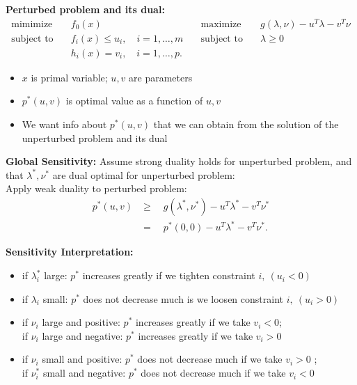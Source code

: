 \documentclass{report}
\theoremstyle{remark} \newtheorem{remark}{Remark}[section]
\theoremstyle{definition}
\theoremstyle{definition}
\theoremstyle{definition}
\theoremstyle{remark}
\begin{document}
\textbf{Perturbed problem and its dual:}
\begin{align*}
    \text{mimimize} \quad &f_0(x) &\text{maximize}\quad &g(\lambda,\nu)-u^{T}\lambda-v^{T}\nu \\
    \text{subject to} \quad &f_i(x) \le u_i, \quad i=1,\ldots,m \quad &\text{subject to}\quad &\lambda\ge 0  \\
                            &h_i(x)=v_i, \quad i=1,\ldots,p
.\end{align*}
\begin{itemize}
   \item $x$ is primal variable; $u,v$ are parameters  
       \item $p^{*}(u,v)$ is optimal value as a function of $u,v$ 
           \item We want info about $p^{*}(u,v)$ that we can obtain from the solution of the unperturbed problem and its dual
\end{itemize}


\textbf{Global Sensitivity:}
Assume strong duality holds for unperturbed problem, and that $\lambda^{*}, \nu^{*}$ are dual optimal for unperturbed problem: \\

Apply weak duality to perturbed problem:
\begin{align*}
    p^{*}(u,v) &\ge \quad g(\lambda^{*},\nu^{*}) - u^{T}\lambda^{*} - v^{T}\nu^{*} \\
               &= \quad p^{*}(0,0) - u^{T}\lambda^{*}-v^{T}\nu^{*}
.\end{align*}

\textbf{Sensitivity Interpretation:} \\
\begin{itemize}
    \item  if $\lambda_i^{*}$ large: $ p^{*}$ increases greatly if we tighten constraint $i, \  (u_i < 0)$
        \item if $\lambda_i$ small: $p^{*}$ does not decrease much is we loosen constraint $i, \  (u_i>0)$
             \item if $\nu_i$ large and positive: $p^{*}$ increases greatly if we take $v_i<0$;\\
                 if $\nu_i$ large and negative: $p^{*}$ increases greatly if we take $v_i > 0$
                  \item if $\nu_i$ small and positive: $p^{*}$ does not decrease much if we take $v_i>0$ ; \\
                      if $\nu_i^{*}$ small and negative: $p^{*}$ does not decrease much if we take $v_i < 0$
                
\end{itemize}
\end{document}
